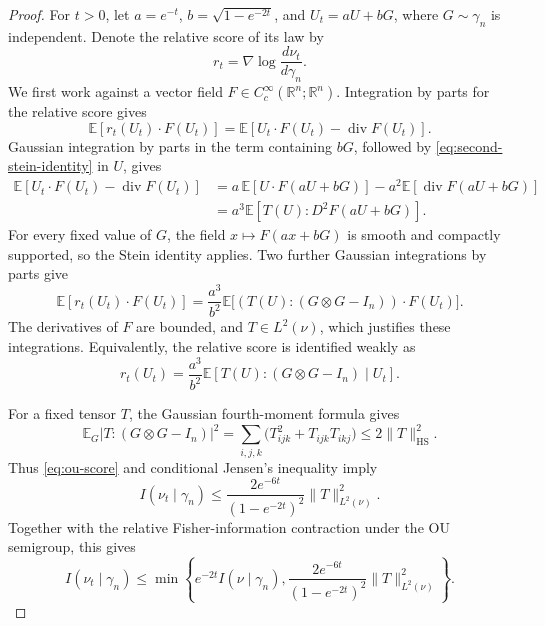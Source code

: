 \documentclass[11pt]{amsart}
\numberwithin{equation}{section}
\theoremstyle{definition}
\theoremstyle{remark}
\newcommand{\R}{\mathbb R}
\newcommand{\E}{\mathbb E}
\newcommand{\Id}{I_n}
\newcommand{\gam}{\gamma_n}
\newcommand{\HS}{\mathrm{HS}}
\newcommand{\norm}[1]{\lVert #1\rVert}
\DeclareMathOperator{\Div}{div}
\begin{document}
\begin{proof}
For \(t>0\), let \(a=e^{-t}\), \(b=\sqrt{1-e^{-2t}}\), and
\(U_t=aU+bG\), where
\(G\sim\gam\) is independent. Denote the relative score of its law by
\[
r_t=\nabla\log\frac{d\nu_t}{d\gam}.
\]
We first work against a vector field \(F\in C_c^\infty(\R^n;\R^n)\).
Integration by parts for the relative score gives
\[
\E[r_t(U_t)\cdot F(U_t)]
=\E[U_t\cdot F(U_t)-\Div F(U_t)].
\]
Gaussian integration by parts in the term containing \(bG\), followed
by \eqref{eq:second-stein-identity} in \(U\), gives
\begin{align*}
\E[U_t\cdot F(U_t)-\Div F(U_t)]
&=a\,\E[U\cdot F(aU+bG)]-a^2\E[\Div F(aU+bG)]\\
&=a^3\E[T(U):D^2F(aU+bG)].
\end{align*}
For every fixed value of \(G\), the field \(x\mapsto F(ax+bG)\)
is smooth and compactly supported, so the Stein identity applies.
Two further Gaussian integrations by parts give
\[
\E[r_t(U_t)\cdot F(U_t)]
=\frac{a^3}{b^2}
\E\bigl[(T(U):(G\otimes G-\Id))\cdot F(U_t)\bigr].
\]
The derivatives of \(F\) are bounded, and \(T\in L^2(\nu)\), which
justifies these integrations. Equivalently, the relative score is
identified weakly as
\begin{equation}\label{eq:ou-score}
r_t(U_t)
=\frac{a^3}{b^2}
\E[T(U):(G\otimes G-\Id)\mid U_t].
\end{equation}

For a fixed tensor \(T\), the Gaussian fourth-moment formula gives
\begin{equation}\label{eq:hermite-contraction}
\E_G|T:(G\otimes G-\Id)|^2
=\sum_{i,j,k}\bigl(T_{ijk}^2+T_{ijk}T_{ikj}\bigr)
\le2\norm T_{\HS}^2.
\end{equation}
Thus \eqref{eq:ou-score} and conditional Jensen's inequality imply
\begin{equation}\label{eq:ou-second-bound}
I(\nu_t\mid\gam)
\le\frac{2e^{-6t}}{(1-e^{-2t})^2}\norm T_{L^2(\nu)}^2.
\end{equation}
Together with the relative Fisher-information contraction under the OU
semigroup, this gives
\[
I(\nu_t\mid\gam)
\le
\min\left\{
e^{-2t}I(\nu\mid\gam),
\frac{2e^{-6t}}{(1-e^{-2t})^2}\norm T_{L^2(\nu)}^2
\right\}.
\]


\end{proof}
\end{document}
